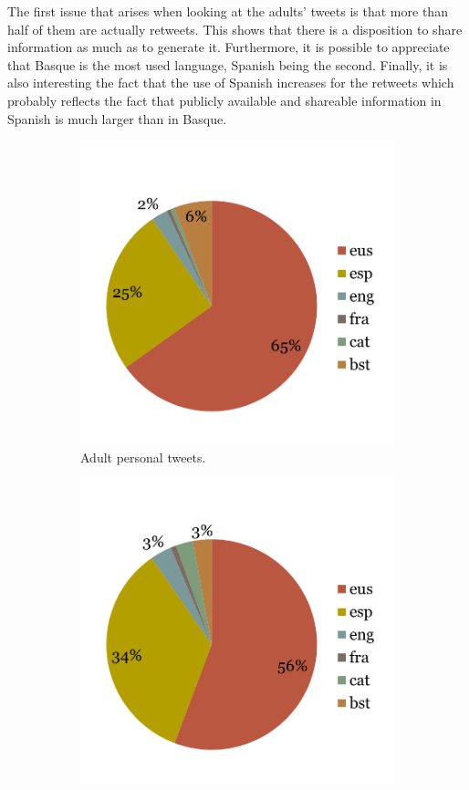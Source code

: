 \documentclass[information,article,submit,moreauthors,pdftex,10pt,a4paper]{Definitions/mdpi}
\begin{document}
The first issue that arises when looking at the adults' tweets is that more than half of them are actually retweets. This shows that there is a disposition to share information as much as to generate it. Furthermore, it is possible to appreciate that Basque is the most used language, Spanish being the second. Finally, it is also interesting the fact that the use of Spanish increases for the retweets which probably reflects the fact that publicly available and shareable information in Spanish is much larger than in Basque.


\begin{figure}[H]
  \centering
  \begin{subfigure}[b]{0.48\linewidth}
    \includegraphics[width=\linewidth]{txio_heldu}
    \caption{Adult personal tweets.}
  \end{subfigure}
  \begin{subfigure}[b]{0.48\linewidth}
    \includegraphics[width=\linewidth]{birtxio_heldu}

\end{subfigure}
\end{figure}
\end{document}
